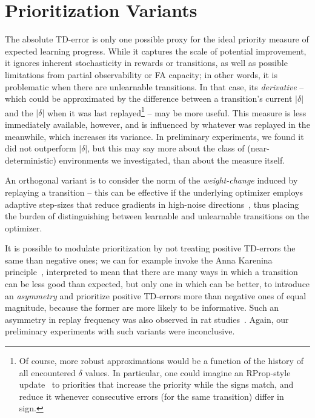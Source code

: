 \documentclass[a4paper]{article}
\begin{document}




\newpage

\appendix


\section{Prioritization Variants}
\label{sec-alternative-td}

The absolute TD-error is only one possible proxy for the ideal priority measure of expected learning progress.
While it captures the scale of potential improvement, it ignores inherent stochasticity in rewards or transitions, 
as well as possible limitations from partial observability or FA capacity; in other words, it is problematic
when there are unlearnable transitions. In that case, its \emph{derivative} -- which could be approximated by the difference between a transition's current $|\delta|$ and the $|\delta|$ when it was last replayed\footnote{Of course, more robust approximations would be a function of the history of all encountered $\delta$ values. 
In particular, one could imagine an RProp-style update~\citep{rprop} to priorities that increase the priority while 
the signs match, and reduce it whenever consecutive errors (for the same transition) differ in sign.}
-- may be more useful. 
This measure is less immediately available, however, and is influenced by whatever was replayed in the meanwhile, which increases its variance. 
In preliminary experiments, we found it  did not outperform $|\delta|$, but this may 
say more about the class of (near-deterministic) environments we investigated, than about the measure itself.

An orthogonal variant is to consider the norm of the \emph{weight-change} induced by replaying a transition -- this can be effective if
the underlying optimizer employs adaptive step-sizes that reduce gradients in high-noise directions~\citep{pesky,adam}, 
thus placing the burden of distinguishing between learnable and unlearnable transitions on the optimizer.


It is possible to modulate prioritization by not treating positive TD-errors the same than negative ones; we can for example invoke the
Anna Karenina principle~\citep{jdiamond-zebras}, interpreted to mean that there are many ways in which 
a transition can be less good than expected, but only one in which can be better, to introduce an \emph{asymmetry} and prioritize
positive TD-errors more than negative ones of equal magnitude, because the former are more likely to be informative.
Such an asymmetry in replay frequency was also observed in rat studies~\citep{dharsh4}.
Again, our preliminary experiments with such variants were inconclusive.
\end{document}
